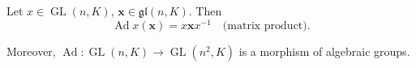 Let $x \in \operatorname{GL}(n, K)$, $\mathbf{x} \in \mathfrak{gl}(n, K)$. Then
$$\operatorname{Ad} x(\mathbf{x}) = x \mathbf{x} x^{-1} \quad \text{(matrix product)}.$$

Moreover, $\operatorname{Ad}: \operatorname{GL}(n, K) \rightarrow \operatorname{GL}(n^2, K)$ is a morphism of algebraic groups.
